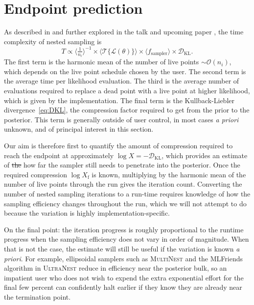 \documentclass[usenatbib]{mnras}
\newcommand{\nlive}{n_i}
\newcommand{\Like}{\mathcal{L}}
\newcommand{\DKL}{\mathcal{D}_\mathrm{KL}}
\providecommand{\DIFdeltex}[1]{{\protect\color{red}\sout{#1}}}                      %
\providecommand{\DIFdelbegin}{} %
\providecommand{\DIFdelend}{} %
\providecommand{\DIFdel}[1]{\texorpdfstring{\DIFdeltex{#1}}{}} %
\newcommand{\DIFscaledelfig}{0.5}
\newlength{\DIFdelgraphicswidth} %
\newlength{\DIFdelgraphicsheight} %
\newcommand{\DIFdelincludegraphics}[2][]{%
\sbox{\DIFdelgraphicsbox}{\DIFOincludegraphics[#1]{#2}}%
\settoboxwidth{\DIFdelgraphicswidth}{\DIFdelgraphicsbox} %
\settoboxtotalheight{\DIFdelgraphicsheight}{\DIFdelgraphicsbox} %
\scalebox{\DIFscaledelfig}{%
\parbox[b]{\DIFdelgraphicswidth}{\usebox{\DIFdelgraphicsbox}\\[-\baselineskip] \rule{\DIFdelgraphicswidth}{0em}}\llap{\resizebox{\DIFdelgraphicswidth}{\DIFdelgraphicsheight}{%
\setlength{\unitlength}{\DIFdelgraphicswidth}%
\begin{picture}(1,1)%
\thicklines\linethickness{2pt} %
{\color[rgb]{1,0,0}\put(0,0){\framebox(1,1){}}}%
{\color[rgb]{1,0,0}\put(0,0){\line( 1,1){1}}}%
{\color[rgb]{1,0,0}\put(0,1){\line(1,-1){1}}}%
\end{picture}%
}\hspace*{3pt}}} %
} %
\DeclareRobustCommand{\DIFdelbegin}{\DIFOdelbegin \let\includegraphics\DIFdelincludegraphics} %
\DeclareRobustCommand{\DIFdelend}{\DIFOaddend \let\includegraphics\DIFOincludegraphics} %
\begin{document}
\section{Endpoint prediction}\label{sec:endpoint}
As described in \citet{supernest} and further explored in the talk and upcoming paper \citet{kcl_talk, scaling_frontier}, the time complexity of nested sampling is
\begin{equation}
    T \propto \langle \tfrac{1}{\nlive} \rangle^{-1} \times \langle \mathcal{T}\{ \Like(\theta) \} \rangle \times \langle f_\mathrm{sampler} \rangle \times \DKL.
\end{equation}
The first term is the harmonic mean of the number of live points $\sim\mathcal{O}(n_i)$, which depends on the live point schedule chosen by the user. The second term is the average time per likelihood evaluation. The third is the average number of evaluations required to replace a dead point with a live point at higher likelihood, which is given by the implementation. The final term is the Kullback-Liebler divergence~\cref{eq:DKL}, the compression factor required to get from the prior to the posterior. This term is generally outside of user control, in most cases \textit{a priori} unknown, and of principal interest in this section.
\par
Our aim is therefore first to quantify the amount of compression required to reach the endpoint at approximately $\log X = -\DKL$, which provides an estimate of \DIFdelbegin \DIFdel{the }\DIFdelend how far the sampler still needs to penetrate into the posterior. Once the required compression $\log X_\mathrm{f}$ is known, multiplying by the harmonic mean of the number of live points through the run gives the iteration count. Converting the number of nested sampling iterations to a run-time requires knowledge of how the sampling efficiency changes throughout the run, which we will not attempt to do because the variation is highly implementation-specific. 
\par
On the final point: the iteration progress is roughly proportional to the runtime progress when the sampling efficiency does not vary in order of magnitude. When that is not the case, the estimate will still be useful if the variation is known \textit{a priori}. For example, ellipsoidal samplers such as \textsc{MultiNest} and the MLFriends algorithm in \textsc{UltraNest} reduce in efficiency near the posterior bulk, so an impatient user who does not wish to expend the extra exponential effort for the final few percent can confidently halt earlier if they know they are already near the termination point.
\end{document}
